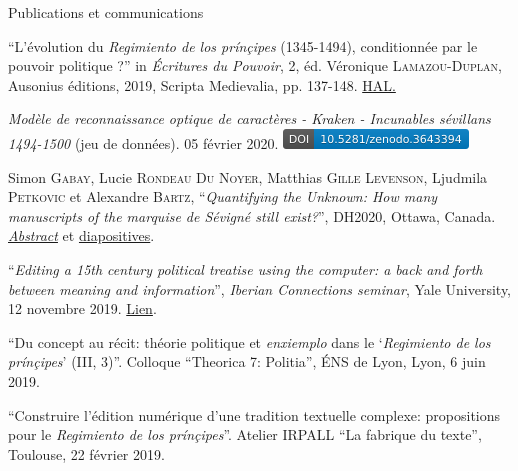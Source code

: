 \begin{rubric}{Publications et communications}
                
                    
                    \entry*
                 \enquote{L'évolution du \textit{Regimiento de los prínçipes}
                        (1345-1494), conditionnée par le pouvoir politique
                        ?} in \textit{Écritures du
                        Pouvoir}, 2, éd. Véronique
                        \textsc{Lamazou-Duplan}, Ausonius éditions, 2019,
                        Scripta Medievalia, pp. 137-148. \href{https://hal.archives-ouvertes.fr/hal-02369116}{HAL.} 
                    
                    \entry*
                \textit{Modèle de reconnaissance optique de
                        caractères - Kraken - Incunables sévillans
                        1494-1500} (jeu de données). 05 février 2020.
                        \href{https://zenodo.org/record/3643393}{\includegraphics[scale=0.55]{img/kraken_doi.png}}
                    
                    \entry*
                Simon \textsc{Gabay}, Lucie \textsc{Rondeau Du
                        Noyer}, Matthias \textsc{Gille Levenson},
                        Ljudmila \textsc{Petkovic} et Alexandre
                        \textsc{Bartz}, \enquote{\textit{Quantifying the Unknown:
                        How many manuscripts of the marquise de Sévigné still
                        exist?}}, DH2020, Ottawa, Canada. \href{https://hal.archives-ouvertes.fr/hal-02898929/document}{\textit{Abstract}} et \href{http://dx.doi.org/10.17613/2pwa-0f46}{diapositives}.
                    
                    \entry*
                 \enquote{\textit{Editing a 15th century political
                        treatise using the computer: a back and forth between
                        meaning and information}}, \textit{Iberian
                        Connections seminar}, Yale University, 12 novembre
                        2019. \href{https://iberian-connections.yale.edu/articles/editing-a-xvth-century-political-treatise-using-the-computer/}{Lien}.
                    
                    \entry*
                 \enquote{Du concept au récit:
                        théorie politique et \textit{enxiemplo} dans le
                        \enquote{\textit{Regimiento de los prínçipes}}
                        (III, 3)}. Colloque \enquote{Theorica 7:
                        Politia}, ÉNS de Lyon, Lyon, 6 juin 2019. 
                    
                    \entry*
                \enquote{Construire l'édition numérique d'une
                        tradition textuelle complexe: propositions pour le
                        \textit{Regimiento de los
                        prínçipes}}. Atelier IRPALL \enquote{La
                        fabrique du texte}, Toulouse, 22
                        février 2019.\end{rubric}


